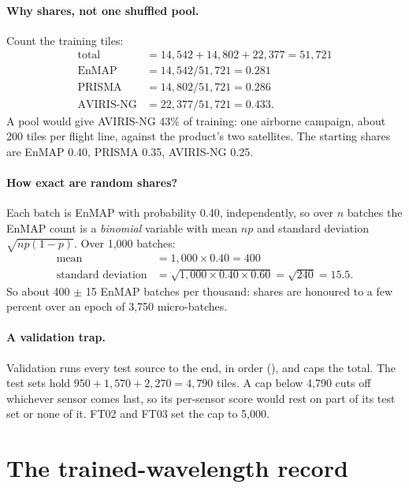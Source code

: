 \paragraph{Why shares, not one shuffled pool.} Count the training tiles:\tbrk{}
\begin{align*}
  \text{total} &= 14{,}542 + 14{,}802 + 22{,}377 = 51{,}721\\
  \text{EnMAP} &= 14{,}542 / 51{,}721 = 0.281\\
  \text{PRISMA} &= 14{,}802 / 51{,}721 = 0.286\\
  \text{AVIRIS-NG} &= 22{,}377 / 51{,}721 = 0.433.
\end{align*}
A pool would give AVIRIS-NG 43\% of training: one airborne campaign, about 200 tiles per flight line, against the product's two satellites. The
starting shares are EnMAP 0.40, PRISMA 0.35, AVIRIS-NG 0.25.

\paragraph{How exact are random shares?} Each batch is EnMAP with probability 0.40, independently, so over $n$ batches the EnMAP count is a
\emph{binomial} variable with mean $np$ and standard deviation $\sqrt{np(1-p)}$. Over 1,000 batches:
\begin{align*}
  \text{mean} &= 1{,}000 \times 0.40 = 400\\
  \text{standard deviation} &= \sqrt{1{,}000 \times 0.40 \times 0.60} = \sqrt{240} = 15.5.
\end{align*}
So about 400 $\pm$ 15 EnMAP batches per thousand: shares are honoured to a few percent over an epoch of 3,750 micro-batches.

\paragraph{A validation trap.} Validation runs every test source to the end, in order (), and
 caps the total. The test sets hold $950 + 1{,}570 + 2{,}270 = 4{,}790$ tiles. A cap below 4,790 cuts off whichever sensor
comes last, so its per-sensor score would rest on part of its test set or none of it. FT02 and FT03 set the cap to 5,000.\tbrk{}

\section{The trained-wavelength record}\label{sec:finetune:record}


